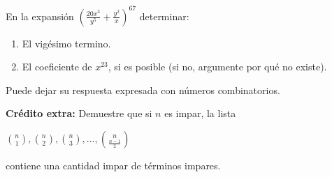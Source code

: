 \documentclass[12pt]{article}
\begin{document}
\begin{problema}
    En la expansión $(\frac{20x^3}{y^5} + \frac{y^2}{x})^{67}$ determinar:

    \renewcommand{\labelenumi}{\alph{enumi})}
    \begin{enumerate}
        \item El vigésimo termino.
        \item El coeficiente de $x^{23}$, si es posible (si no, argumente por qué no existe).
    \end{enumerate}

    Puede dejar su respuesta expresada con números combinatorios.
\end{problema}

\textbf{Crédito extra:} Demuestre que si $n$ es impar, la lista

\begin{center}
    $\binom{n}{1}, \binom{n}{2}, \binom{n}{3}, ... , \binom{n}{\frac{n-1}{2}}$
\end{center}

contiene una cantidad impar de términos impares.
\end{document}

